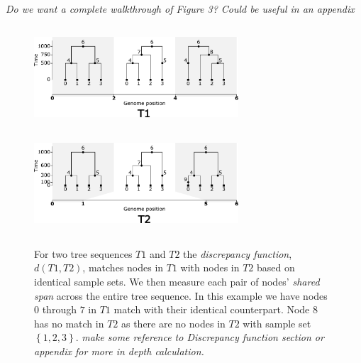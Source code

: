 \documentclass[10pt,twoside,lineno]{gsajnl}
\newcommand{\comment}[1]{{\color{violet} \it #1}}
\begin{document}
\comment{Do we want a complete walkthrough of Figure 3? Could be useful in an appendix} 

\begin{figure}[!ht]
	\begin{center}
\includegraphics[height=1.5in, width=3in]{discrepancy_func_method_t1.pdf}
\includegraphics[height=1.5in, width=3in]{discrepancy_function_method_t2.pdf}
    \caption{
        For two tree sequences $T1$ and $T2$ the \textit{discrepancy function}, $d(T1,T2)$, matches nodes in $T1$ with nodes in $T2$
        based on identical sample sets. We then measure each pair of nodes' \textit{shared span} across the entire tree sequence.
        In this example we have nodes $0$ through $7$ in $T1$ match with their identical counterpart. 
        Node $8$ has no match in $T2$ as there are no nodes in $T2$ with sample set $\left\{1,2,3\right\}$.
        \comment{make some reference to Discrepancy function section or appendix for more in depth calculation.}
        \label{fig:conceptual_discrepancy}
    }
	\end{center}
\end{figure}
\end{document}
